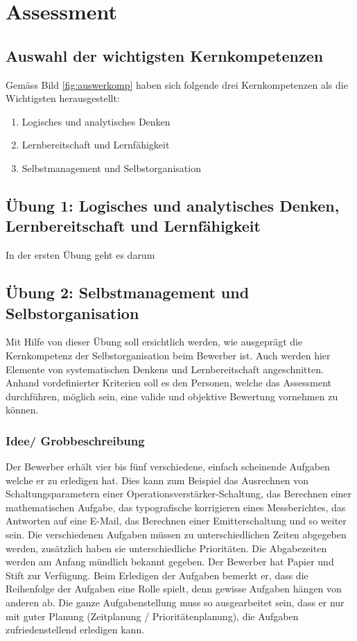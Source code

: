 \chapter{Assessment}

\section{Auswahl der wichtigsten Kernkompetenzen}

Gemäss Bild \ref{fig:auswerkomp} haben sich folgende drei Kernkompetenzen als die Wichtigsten herausgestellt:

\begin{enumerate} 
\item{Logisches und analytisches Denken}
\item{Lernbereitschaft und Lernfähigkeit}
\item{Selbstmanagement und Selbstorganisation}
\end{enumerate}

\section{Übung 1: Logisches und analytisches Denken, Lernbereitschaft und Lernfähigkeit}

In der ersten Übung geht es darum

\section{Übung 2: Selbstmanagement und Selbstorganisation}

Mit Hilfe von dieser Übung soll ersichtlich werden, wie ausgeprägt die Kernkompetenz der Selbstorganisation beim Bewerber ist. Auch werden hier Elemente von systematischen Denkens und Lernbereitschaft angeschnitten. Anhand vordefinierter Kriterien soll es den Personen, welche das Assessment durchführen, möglich sein, eine valide und objektive Bewertung vornehmen zu können.

\subsection{Idee/ Grobbeschreibung}

Der Bewerber erhält vier bis fünf verschiedene, einfach scheinende Aufgaben welche er zu erledigen hat. Dies kann zum Beispiel das Ausrechnen von Schaltungsparametern einer Operationsverstärker-Schaltung, das Berechnen einer
mathematischen Aufgabe, das typografische korrigieren eines Messberichtes, das Antworten auf eine E-Mail, das Berechnen einer Emitterschaltung und so weiter sein. Die verschiedenen Aufgaben müssen zu unterschiedlichen Zeiten abgegeben werden, zusätzlich haben sie unterschiedliche Prioritäten. Die Abgabezeiten werden am Anfang mündlich bekannt gegeben. Der Bewerber hat Papier und Stift zur Verfügung.
Beim Erledigen der Aufgaben bemerkt er, dass die Reihenfolge der Aufgaben eine Rolle spielt, denn gewisse Aufgaben hängen von anderen ab. Die ganze Aufgabenstellung muss so ausgearbeitet sein, dass er nur mit
guter Planung (Zeitplanung / Prioritätenplanung), die Aufgaben zufriedenstellend erledigen kann.

